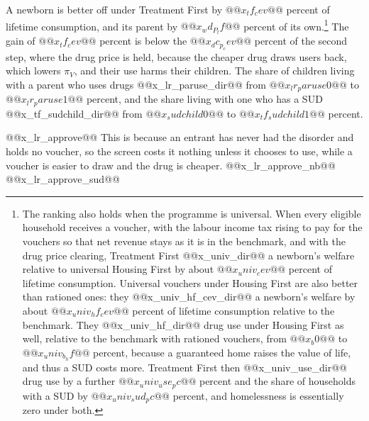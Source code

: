 \documentclass[10pt]{article}
\begin{document}
A newborn is better off under Treatment First by $@@x_tf_cev@@$ percent of lifetime consumption, and its parent by $@@x_wd_P_tf@@$ percent of its own.\footnote{The ranking also holds when the programme is universal.  When every eligible household receives a voucher, with the labour income tax rising to pay for the vouchers so that net revenue stays as it is in the benchmark, and with the drug price clearing, Treatment First @@x_univ_dir@@ a newborn's welfare relative to universal Housing First by about $@@x_univ_cev@@$ percent of lifetime consumption.  Universal vouchers under Housing First are also better than rationed ones: they @@x_univ_hf_cev_dir@@ a newborn's welfare by about $@@x_univ_hf_cev@@$ percent of lifetime consumption relative to the benchmark. They @@x_univ_hf_dir@@ drug use under Housing First as well, relative to the benchmark with rationed vouchers, from $@@x_b0@@$ to $@@x_univ_b_hf@@$ percent, because  a guaranteed home raises the value of life, and thus a SUD costs more. Treatment First then @@x_univ_use_dir@@ drug use by a further $@@x_univ_use_pc@@$ percent and the share of households with a SUD by $@@x_univ_sud_pc@@$ percent, and homelessness is  essentially zero under both. } The gain of $@@x_tf_cev@@$ percent is below the $@@x_dc_p_cev@@$ percent of the second step, where the drug price is held, because the cheaper drug draws users back, which lowers $\pi_V$, and their use harms their children. The share of children living with a parent who uses drugs @@x_lr_paruse_dir@@ from $@@x_lr_paruse0@@$ to $@@x_lr_paruse1@@$ percent, and the share living with one who has a SUD @@x_tf_sudchild_dir@@ from $@@x_sudchild0@@$ to $@@x_tf_sudchild1@@$ percent.

@@x_lr_approve@@ This is because an entrant has never had the disorder and holds no voucher, so the screen costs it nothing unless it chooses to use, while a voucher is easier to draw and the drug is cheaper. @@x_lr_approve_nb@@ @@x_lr_approve_sud@@
\end{document}
